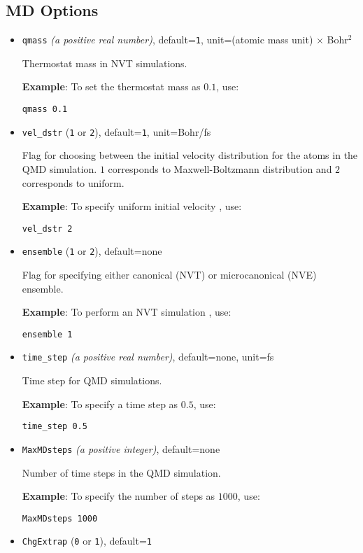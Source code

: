 \documentclass[12pt]{report}
\begin{document}
\subsection{MD Options}

\begin{itemize}
\item\texttt{qmass} {\it{(a positive real number)}}, default=\texttt{1}, unit=(atomic mass unit) $\times$ Bohr$^2$

Thermostat mass in NVT simulations.
 
{\bf{Example}}: To set the thermostat mass as $0.1$, use: 

\texttt{qmass 0.1}

\item\texttt{vel\_dstr} {(\texttt{1} or \texttt{2})}, default=\texttt{1}, unit=Bohr/fs

Flag for choosing between the initial velocity distribution for the atoms in the QMD simulation. $1$ corresponds to Maxwell-Boltzmann distribution and $2$ corresponds to uniform. 

{\bf{Example}}: To specify uniform initial velocity , use: 

\texttt{vel\_dstr 2}

\item\texttt{ensemble} {(\texttt{1} or \texttt{2})}, default=none

Flag for specifying either canonical (NVT) or microcanonical (NVE) ensemble.
 
{\bf{Example}}: To perform an NVT simulation , use: 

\texttt{ensemble 1}

\item\texttt{time\_step} {\it{(a positive real number)}}, default=none, unit=fs

Time step for QMD simulations.
 
{\bf{Example}}: To specify a time step as $0.5$, use: 

\texttt{time\_step 0.5}

\item\texttt{MaxMDsteps} {\it{(a positive integer)}}, default=none

Number of time steps in the QMD simulation.

{\bf{Example}}: To specify the number of steps as $1000$, use: 

\texttt{MaxMDsteps 1000}

\item\texttt{ChgExtrap} {(\texttt{0} or \texttt{1})}, default=\texttt{1}


\end{itemize}
\end{document}
